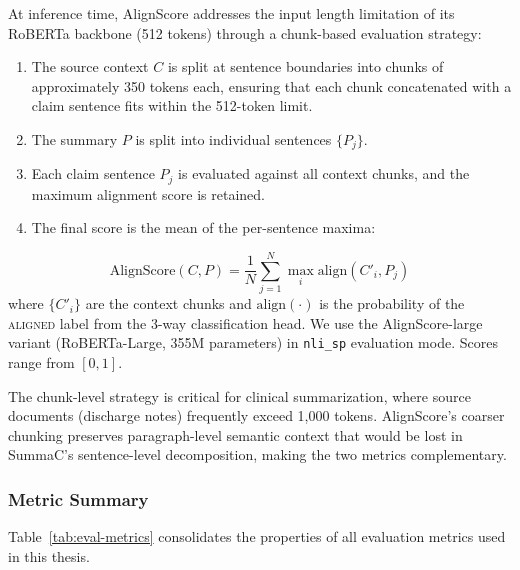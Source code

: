 \documentclass[12pt,a4paper,oneside]{report}
\begin{document}
At inference time, AlignScore addresses the input length limitation of its RoBERTa backbone (512 tokens) through a chunk-based evaluation strategy:

\begin{enumerate}
    \item The source context $C$ is split at sentence boundaries into chunks of approximately 350 tokens each, ensuring that each chunk concatenated with a claim sentence fits within the 512-token limit.
    \item The summary $P$ is split into individual sentences $\{P_j\}$.
    \item Each claim sentence $P_j$ is evaluated against all context chunks, and the maximum alignment score is retained.
    \item The final score is the mean of the per-sentence maxima:
\end{enumerate}
\begin{equation}
    \text{AlignScore}(C, P) = \frac{1}{N} \sum_{j=1}^{N} \max_{i} \text{align}(C'_i, P_j)
    \label{eq:alignscore}
\end{equation}
where $\{C'_i\}$ are the context chunks and $\text{align}(\cdot)$ is the probability of the \textsc{aligned} label from the 3-way classification head. We use the AlignScore-large variant (RoBERTa-Large, 355M parameters) in \texttt{nli\_sp} evaluation mode. Scores range from $[0, 1]$.

The chunk-level strategy is critical for clinical summarization, where source documents (discharge notes) frequently exceed 1,000 tokens. AlignScore's coarser chunking preserves paragraph-level semantic context that would be lost in SummaC's sentence-level decomposition, making the two metrics complementary.

\subsubsection{Metric Summary}

Table~\ref{tab:eval-metrics} consolidates the properties of all evaluation metrics used in this thesis.
\end{document}
